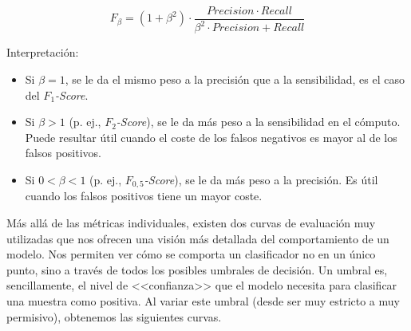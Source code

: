 \begin{itemize}
	\[F_\beta = (1 + \beta^2) \cdot \frac{Precision \cdot Recall}{\beta^2 \cdot Precision + Recall}\]
	
	Interpretación:
	\begin{itemize}
		\item Si $\beta = 1$, se le da el mismo peso a la precisión que a la sensibilidad, es el caso del \textit{$F_1$-Score}.
		
		\item Si $\beta > 1$ (p. ej., \textit{$F_2$-Score}), se le da más peso a la sensibilidad en el cómputo. Puede resultar útil cuando el coste de los falsos negativos es mayor al de los falsos positivos.
		
		\item Si $0 < \beta < 1$ (p. ej., \textit{$F_{0,5}$-Score}), se le da más peso a la precisión. Es útil cuando los falsos positivos tiene un mayor coste.
	\end{itemize}
\end{itemize}

Más allá de las métricas individuales, existen dos curvas de evaluación muy utilizadas que nos ofrecen una visión más detallada del comportamiento de un modelo. Nos permiten ver cómo se comporta un clasificador no en un único punto, sino a través de todos los posibles umbrales de decisión. Un umbral es, sencillamente, el nivel de <<confianza>> que el modelo necesita para clasificar una muestra como positiva. Al variar este umbral (desde ser muy estricto a muy permisivo), obtenemos las siguientes curvas.

